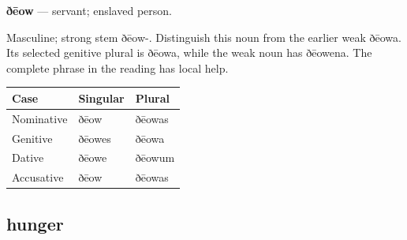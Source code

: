 \par\begin{minipage}{\linewidth}\raggedright
\textbf{ðēow} — servant; enslaved person.

Masculine; strong stem ðēow-. Distinguish this noun from the earlier weak ðēowa. Its selected genitive plural is ðēowa, while the weak noun has ðēowena. The complete phrase in the reading has local help.

\par\begingroup
\fontsize{10.5}{13.2}\selectfont
\setlength{\LTleft}{0pt}\setlength{\LTright}{\fill}
\noindent
\begin{tabular}{@{}>{\raggedright\arraybackslash}p{39.46mm}>{\raggedright\arraybackslash}p{39.46mm}>{\raggedright\arraybackslash}p{39.46mm}@{}}
\toprule
\textbf{Case} & \textbf{Singular} & \textbf{Plural} \\
\midrule
Nominative & ðēow & ðēowas \\
Genitive & ðēowes & ðēowa \\
Dative & ðēowe & ðēowum \\
Accusative & ðēow & ðēowas \\
\bottomrule
\end{tabular}
\par\endgroup

\end{minipage}\par
{}
\subsection*{hunger}

